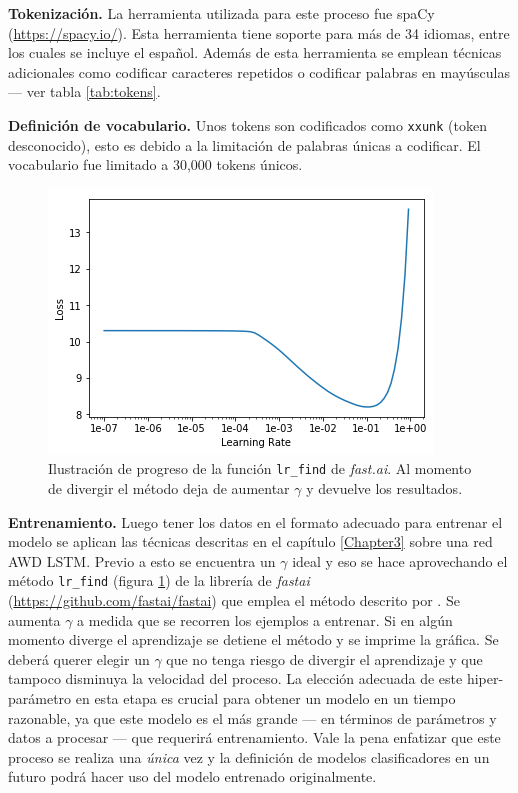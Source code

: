\textbf{Tokenización.} La herramienta utilizada para este proceso fue spaCy (\url{https://spacy.io/}). Esta herramienta tiene soporte para más de 34 idiomas, entre los cuales se incluye el español. Además de esta herramienta se emplean técnicas adicionales como codificar caracteres repetidos o codificar palabras en mayúsculas --- ver tabla \ref{tab:tokens}.

\textbf{Definición de vocabulario.} Unos tokens son codificados como \texttt{xxunk} (token desconocido), esto es debido a la limitación de palabras únicas a codificar. El vocabulario fue limitado a 30,000 tokens únicos.

\begin{figure}
\centering
\includegraphics[scale=1]{Figures/lrfinder.png}
\caption{Ilustración de progreso de la función \texttt{lr\_find} de \textit{fast.ai}. Al momento de divergir el método deja de aumentar $\gamma$ y devuelve los resultados.}
\label{fig:lrfind}
\end{figure}

\textbf{Entrenamiento.} Luego tener los datos en el formato adecuado para entrenar el modelo se aplican las técnicas descritas en el capítulo \ref{Chapter3} sobre una red AWD LSTM. Previo a esto se encuentra un $ \gamma $ ideal y eso se hace aprovechando el método \texttt{lr\_find} (figura \ref{fig:lrfind}) de la librería de \emph{fastai} (\url{https://github.com/fastai/fastai}) que emplea el método descrito por \textcite{smith2017convergence}. Se aumenta $\gamma$ a medida que se recorren los ejemplos a entrenar. Si en algún momento diverge el aprendizaje se detiene el método y se imprime la gráfica. Se deberá querer elegir un $\gamma$ que no tenga riesgo de divergir el aprendizaje y que tampoco disminuya la velocidad del proceso. La elección adecuada de este hiper-parámetro en esta etapa es crucial para obtener un modelo en un tiempo razonable, ya que este modelo es el más grande --- en términos de parámetros y datos a procesar --- que requerirá entrenamiento. Vale la pena enfatizar que este proceso se realiza una \emph{única} vez y la definición de modelos clasificadores en un futuro podrá hacer uso del modelo entrenado originalmente.

